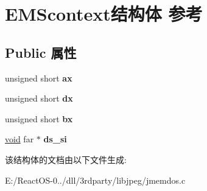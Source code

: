 \hypertarget{struct_e_m_scontext}{}\section{E\+M\+Scontext结构体 参考}
\label{struct_e_m_scontext}
\subsection*{Public 属性}
\begin{DoxyCompactItemize}
\item 
\mbox{\label{struct_e_m_scontext_ab1a85d2ff0bf69aa3daad36e742cf757}} 
unsigned short {\bfseries ax}
\item 
\mbox{\label{struct_e_m_scontext_aee8f592e3beedae16d64c8b69bbc313a}} 
unsigned short {\bfseries dx}
\item 
\mbox{\label{struct_e_m_scontext_a563d27986fa97db36b43ef51ecc4c9d1}} 
unsigned short {\bfseries bx}
\item 
\mbox{\label{struct_e_m_scontext_a443b38ca200b15128af15a1ae1968c2e}} 
\hyperlink{interfacevoid}{void} far $\ast$ {\bfseries ds\+\_\+si}
\end{DoxyCompactItemize}


该结构体的文档由以下文件生成\+:\begin{DoxyCompactItemize}
\item 
E\+:/\+React\+O\+S-\/0../dll/3rdparty/libjpeg/jmemdos.\+c\end{DoxyCompactItemize}
